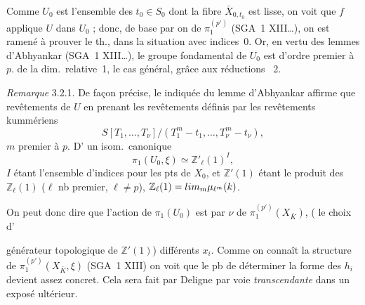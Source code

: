 \documentclass[11pt,a4paper]{article}
\begin{document}
Comme $U_0$ est l'ensemble des $t_0 \in S_0$ dont la fibre $\bar X_{0, t_0}$ est lisse, on voit que $f$ applique $U$ dans $U_0$ ; donc,    de base par  \ill{} \struck{\ill{}} on    de \ill{} $\pi_1^{(p')}$ (SGA~1 XIII…), on est ramené à prouver le th., \struck{\ill{}} dans la situation \add{(\uncertain{\ill{}})} avec indices~$0$. Or, en vertu des  lemmes d'Abhyankar (SGA~1 XIII…), le groupe fondamental de $U_0$ est \struck{\ill{}} \struck{\ill{}}  d'ordre premier à~$p$.   de la dim.\ relative~1,   le cas général, grâce aux réductions  \ill{}~2.

\emph{Remarque} 3.2.1. De façon précise, le  indiquée du lemme d'Abhyankar affirme que   revêtements  de $U$ en prenant les revêtements  \uncertain{\ill{}} \ill{} définis par les revêtements kummériens
\[
S[T_1, \ldots, T_\nu]/(T_1^m - t_1, \ldots, T_\nu^m - t_\nu) ,
\]
 $m$ premier à $p$. D' un isom.\ canonique
\[
\pi_1(U_0, \xi) \simeq \mathbb{Z}'_\ell(1)^I ,
\]
$I$ étant l'ensemble d'indices pour  les pts   de $X_0$, et $\mathbb{Z}'(1)$ étant le produit des $\mathbb{Z}_\ell(1)$ ($\ell$ nb premier,  $\ell \neq p$), $\mathbb{Z}_\ell(1) = \varprojlim_m \mu_{\ell^m}(k)$.

On peut donc dire que l'action de $\pi_1(U_0)$ est   par \struck{\ill{}}  $\nu$ \struck{\ill{}}   de $\pi_1^{(p')}(X_{\bar K})$,  ( le choix d'

générateur topologique de $\mathbb{Z}'(1)$)   différents $x_i$.  Comme on connaît la structure  de $\pi_1^{(p')}(X_{\bar K}, \xi)$ (SGA~1 XIII) \struck{\ill{}} on voit que le pb de déterminer la forme des $h_i$ devient assez concret. Cela \struck{\ill{}} sera fait par Deligne par voie \emph{transcendante} dans un exposé ultérieur.
\end{document}
